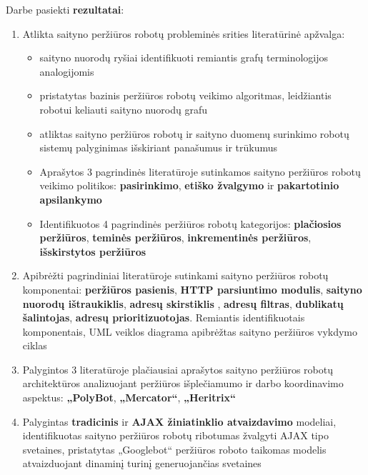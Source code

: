 
Darbe pasiekti \textbf{rezultatai}: 

\begin{enumerate}
    \item Atlikta saityno peržiūros robotų probleminės srities literatūrinė apžvalga: 
    \begin{itemize}
        \item  saityno nuorodų ryšiai identifikuoti remiantis grafų terminologijos analogijomis
        \item pristatytas bazinis peržiūros robotų veikimo algoritmas, leidžiantis robotui keliauti saityno nuorodų grafu
        \item atliktas saityno peržiūros robotų ir saityno duomenų surinkimo robotų sistemų palyginimas išskiriant panašumus ir trūkumus
        \item Aprašytos 3 pagrindinės literatūroje sutinkamos saityno peržiūros robotų veikimo politikos: \textbf{pasirinkimo}, \textbf{etiško žvalgymo} ir \textbf{pakartotinio apsilankymo}
        \item Identifikuotos 4 pagrindinės peržiūros robotų kategorijos: \textbf{plačiosios peržiūros}, \textbf{teminės peržiūros}, \textbf{inkrementinės peržiūros}, \textbf{išskirstytos peržiūros}
    \end{itemize}
    
    \item Apibrėžti pagrindiniai literatūroje sutinkami saityno peržiūros robotų komponentai: \textbf{peržiūros pasienis}, \textbf{HTTP parsiuntimo modulis}, \textbf{saityno nuorodų ištraukiklis}, \textbf{adresų skirstiklis} , \textbf{adresų filtras}, \textbf{dublikatų šalintojas}, \textbf{adresų prioritizuotojas}. Remiantis identifikuotais komponentais, UML veiklos diagrama apibrėžtas saityno peržiūros vykdymo ciklas
    
    
    \item Palygintos 3 literatūroje plačiausiai aprašytos saityno peržiūros robotų architektūros analizuojant peržiūros išplečiamumo ir darbo koordinavimo aspektus: \textbf{„PolyBot}, \textbf{„Mercator“}, \textbf{„Heritrix“} 
    
    
    \item Palygintas \textbf{tradicinis} ir \textbf{AJAX žiniatinklio atvaizdavimo} modeliai, identifikuotas saityno peržiūros robotų ribotumas žvalgyti AJAX tipo svetaines, pristatytas „Googlebot“ peržiūros roboto taikomas modelis atvaizduojant dinaminį turinį generuojančias svetaines
    

\end{enumerate}
